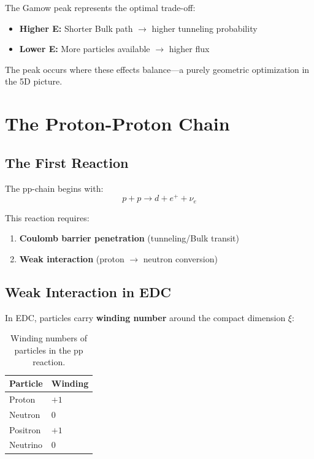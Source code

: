 \documentclass[12pt,a4paper]{article}
\begin{document}
\begin{insight}
The Gamow peak represents the optimal trade-off:
\begin{itemize}
    \item \textbf{Higher E:} Shorter Bulk path $\to$ higher tunneling probability
    \item \textbf{Lower E:} More particles available $\to$ higher flux
\end{itemize}

The peak occurs where these effects balance---a purely geometric optimization in the 5D picture.
\end{insight}

\section{The Proton-Proton Chain}

\subsection{The First Reaction}

The pp-chain begins with:
\begin{equation}
p + p \to d + e^+ + \nu_e
\end{equation}

This reaction requires:
\begin{enumerate}
    \item \textbf{Coulomb barrier penetration} (tunneling/Bulk transit)
    \item \textbf{Weak interaction} (proton $\to$ neutron conversion)
\end{enumerate}

\subsection{Weak Interaction in EDC}

In EDC, particles carry \textbf{winding number} around the compact dimension $\xi$:

\begin{table}[H]
\centering
\begin{tabular}{@{}ll@{}}
\toprule
\textbf{Particle} & \textbf{Winding} \\
\midrule
Proton & $+1$ \\
Neutron & $0$ \\
Positron & $+1$ \\
Neutrino & $0$ \\
\bottomrule
\end{tabular}
\caption{Winding numbers of particles in the pp reaction.}
\end{table}
\end{document}
